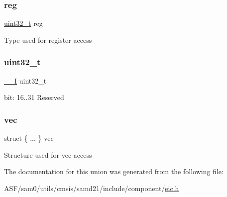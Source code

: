 \subsubsection{\texorpdfstring{reg}{reg}}
{\footnotesize\ttfamily \mbox{\hyperlink{union_e_i_c___i_n_t_f_l_a_g___type_a7c2ec0f7b3f1314bdede58b182af397c}{uint32\+\_\+t}} reg}

Type used for register access \mbox{\label{union_e_i_c___i_n_t_f_l_a_g___type_a7c2ec0f7b3f1314bdede58b182af397c}} 
\subsubsection{\texorpdfstring{uint32\_t}{uint32\_t}}
{\footnotesize\ttfamily \mbox{\hyperlink{core__cm0plus_8h_af63697ed9952cc71e1225efe205f6cd3}{\+\_\+\+\_\+I}} uint32\+\_\+t}

bit\+: 16..31 Reserved \mbox{\label{union_e_i_c___i_n_t_f_l_a_g___type_afaafd5555565b86c40068aaacedab22b}} 
\subsubsection{\texorpdfstring{vec}{vec}}
{\footnotesize\ttfamily struct \{ ... \}   vec}

Structure used for vec access 

The documentation for this union was generated from the following file\+:\begin{DoxyCompactItemize}
\item 
A\+S\+F/sam0/utils/cmsis/samd21/include/component/\mbox{\hyperlink{component_2eic_8h}{eic.\+h}}\end{DoxyCompactItemize}
